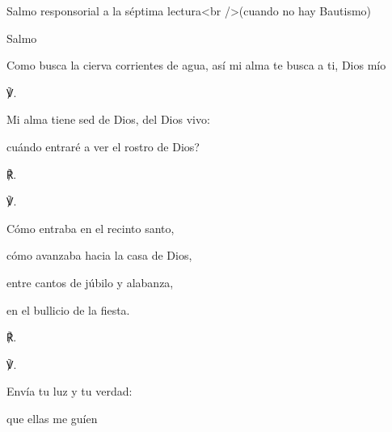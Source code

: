 			\begin{readbook}Salmo responsorial a la séptima lectura<br />(cuando no hay Bautismo)\end{readbook}
			
			\begin{readbook}Salmo \end{readbook}
			
			\begin{readtheme}Como busca la cierva corrientes de agua, así mi alma te busca a ti, Dios mío\end{readtheme}
			
			\begin{readbody}\begin{readred}℣.\end{readred} Mi alma tiene sed de Dios, del Dios vivo: \end{readbody}
			
			\begin{readtabbed}cuándo entraré a ver el rostro de Dios? \begin{readred}℟.\end{readred}\end{readtabbed}
			
			\begin{readbody}\begin{readred}℣.\end{readred} Cómo entraba en el recinto santo, \end{readbody}
			
			\begin{readtabbed}cómo avanzaba hacia la casa de Dios, \end{readtabbed}
			
			\begin{readtabbed}entre cantos de júbilo y alabanza, \end{readtabbed}
			
			\begin{readtabbed}en el bullicio de la fiesta. \begin{readred}℟.\end{readred}\end{readtabbed}
			
			\begin{readbody}\begin{readred}℣.\end{readred} Envía tu luz y tu verdad: \end{readbody}
			
			\begin{readtabbed}que ellas me guíen \end{readtabbed}
			

